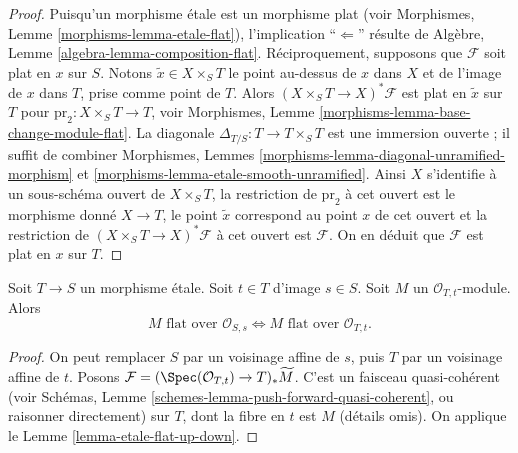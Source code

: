 \begin{proof}
Puisqu'un morphisme \'etale est un morphisme plat (voir
Morphismes, Lemme \ref{morphisms-lemma-etale-flat}),
l'implication ``$\Leftarrow$'' résulte de
Algèbre, Lemme \ref{algebra-lemma-composition-flat}.
Réciproquement, supposons que $\mathcal{F}$ soit plat en $x$ sur $S$.
Notons $\tilde x \in X \times_S T$ le point au-dessus de $x$ dans $X$
et de l'image de $x$ dans $T$, prise comme point de $T$.
Alors $(X \times_S T \to X)^*\mathcal{F}$ est plat en $\tilde x$ sur $T$
pour $\text{pr}_2 : X \times_S T \to T$, voir
Morphismes, Lemme \ref{morphisms-lemma-base-change-module-flat}.
La diagonale $\Delta_{T/S} : T \to T \times_S T$ est une immersion ouverte ;
il suffit de combiner
Morphismes, Lemmes \ref{morphisms-lemma-diagonal-unramified-morphism} et
\ref{morphisms-lemma-etale-smooth-unramified}.
Ainsi $X$ s'identifie à un sous-schéma ouvert de $X \times_S T$,
la restriction de $\text{pr}_2$ à cet ouvert est le morphisme donné $X \to T$,
le point $\tilde x$ correspond au point $x$ de cet ouvert et
la restriction de $(X \times_S T \to X)^*\mathcal{F}$ à cet ouvert est $\mathcal{F}$.
On en déduit que $\mathcal{F}$ est plat en $x$ sur $T$.
\end{proof}

\begin{lemma}
\label{lemma-etale-flat-up-down-local-ring}
Soit $T \to S$ un morphisme \'etale. Soit $t \in T$ d'image $s \in S$.
Soit $M$ un $\mathcal{O}_{T, t}$-module. Alors
$$
M\text{ flat over }\mathcal{O}_{S, s}
\Leftrightarrow
M\text{ flat over }\mathcal{O}_{T, t}.
$$
\end{lemma}

\begin{proof}
On peut remplacer $S$ par un voisinage affine de $s$, puis
$T$ par un voisinage affine de $t$.
Posons $\mathcal{F} = (\Spec(\mathcal{O}_{T, t}) \to T)_*\widetilde M$.
C'est un faisceau quasi-cohérent (voir
Schémas, Lemme \ref{schemes-lemma-push-forward-quasi-coherent},
ou raisonner directement)
sur $T$, dont la fibre en $t$ est $M$ (détails omis).
On applique
le Lemme \ref{lemma-etale-flat-up-down}.
\end{proof}

